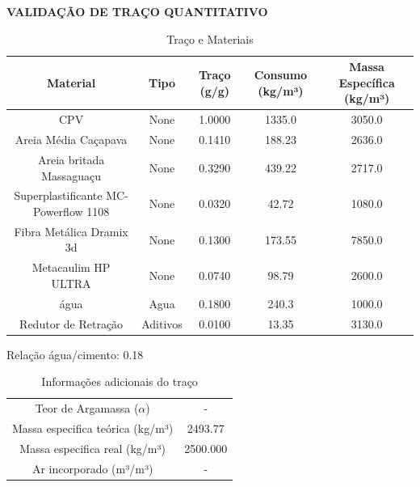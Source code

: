 \documentclass{article}
\begin{document}
\thispagestyle{fancy} 
\begin{center}
    \textbf{\Large VALIDAÇÃO DE TRAÇO QUANTITATIVO}
\end{center}

\vspace{0.5cm}

\begin{table}[h]
    \centering
    \caption{Traço e Materiais}
    \vspace{0.2cm}
    
    \begin{tabular}{|c|c|c|c|c|}
        \hline 
        Material & Tipo & Traço (g/g) & Consumo (kg/m³) & Massa Específica (kg/m³) \\ 
        \hline
                CPV & None & 1.0000 & 1335.0 & 3050.0 \\
        \hline
                Areia Média Caçapava & None & 0.1410 & 188.23 & 2636.0 \\
        \hline
                Areia britada Massaguaçu & None & 0.3290 & 439.22 & 2717.0 \\
        \hline
                Superplastificante MC-Powerflow 1108 & None & 0.0320 & 42.72 & 1080.0 \\
        \hline
                Fibra Metálica Dramix 3d & None & 0.1300 & 173.55 & 7850.0 \\
        \hline
                Metacaulim HP ULTRA & None & 0.0740 & 98.79 & 2600.0 \\
        \hline
                água & Agua & 0.1800 & 240.3 & 1000.0 \\
        \hline
                Redutor de Retração & Aditivos & 0.0100 & 13.35 & 3130.0 \\
        \hline
            \end{tabular}
    
    \label{tab:meu_exemplo}
\end{table}

\vspace{0.3cm}
\noindent Relação água/cimento: 0.18

\vspace{0.5cm}

\begin{table}[h] 
    \centering  
    \caption{Informações adicionais do traço} 
    \vspace{0.2cm}

    \begin{tabular}{|c|c|}
        \hline 
        Teor de Argamassa ($\alpha$) & - \\
        Massa especifica teórica (kg/m³) & 2493.77 \\
        Massa especifica real (kg/m³) & 2500.000 \\
        Ar incorporado (m³/m³) & - \\
        \hline
    \end{tabular}
\end{table}
\end{document}
